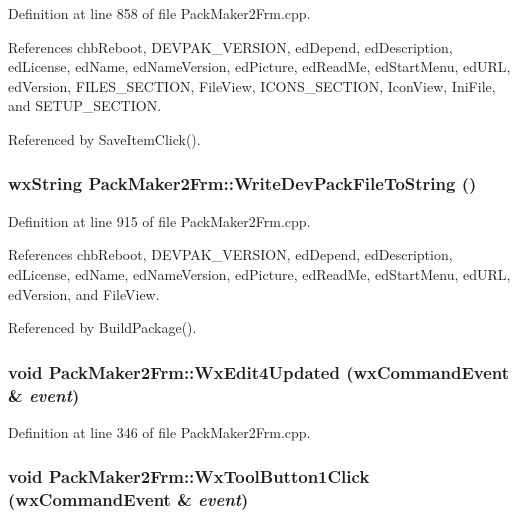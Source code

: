 Definition at line 858 of file Pack\-Maker2Frm.cpp.

References chb\-Reboot, DEVPAK\_\-VERSION, ed\-Depend, ed\-Description, ed\-License, ed\-Name, ed\-Name\-Version, ed\-Picture, ed\-Read\-Me, ed\-Start\-Menu, ed\-URL, ed\-Version, FILES\_\-SECTION, File\-View, ICONS\_\-SECTION, Icon\-View, Ini\-File, and SETUP\_\-SECTION.

Referenced by Save\-Item\-Click().
\subsubsection{\setlength{\rightskip}{0pt plus 5cm}wx\-String Pack\-Maker2Frm::Write\-Dev\-Pack\-File\-To\-String ()}\label{class_pack_maker2_frm_269be442e476aa5e48c8515bb99285ea}




Definition at line 915 of file Pack\-Maker2Frm.cpp.

References chb\-Reboot, DEVPAK\_\-VERSION, ed\-Depend, ed\-Description, ed\-License, ed\-Name, ed\-Name\-Version, ed\-Picture, ed\-Read\-Me, ed\-Start\-Menu, ed\-URL, ed\-Version, and File\-View.

Referenced by Build\-Package().
\subsubsection{\setlength{\rightskip}{0pt plus 5cm}void Pack\-Maker2Frm::Wx\-Edit4Updated (wx\-Command\-Event \& {\em event})}\label{class_pack_maker2_frm_cdb569f73267a3f227946260309df3e7}




Definition at line 346 of file Pack\-Maker2Frm.cpp.
\subsubsection{\setlength{\rightskip}{0pt plus 5cm}void Pack\-Maker2Frm::Wx\-Tool\-Button1Click (wx\-Command\-Event \& {\em event})}\label{class_pack_maker2_frm_bdb19775715ec6361fcaeab592156e38}




